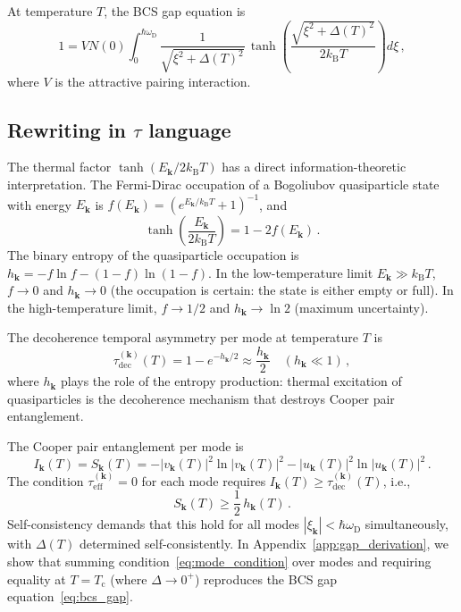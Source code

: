 \documentclass[prb,twocolumn,superscriptaddress,longbibliography,floatfix]{revtex4-2}
\newcommand{\kB}{k_{\mathrm{B}}}
\newcommand{\tauasym}{\tau}
\newcommand{\taueff}{\tauasym_{\mathrm{eff}}}
\newcommand{\taudec}{\tauasym_{\mathrm{dec}}}
\newcommand{\Tc}{T_{\mathrm{c}}}
\newcommand{\oD}{\omega_{\mathrm{D}}}
\newcommand{\Ek}{E_{\bm{k}}}
\newcommand{\xik}{\xi_{\bm{k}}}
\begin{document}
At temperature $T$, the BCS gap equation is~\cite{BCS1957}
\begin{equation}\label{eq:bcs_gap}
  1 = V N(0) \int_0^{\hbar\oD}
  \frac{1}{\sqrt{\xi^2 + \Delta(T)^2}}\,
  \tanh\!\left(\frac{\sqrt{\xi^2 + \Delta(T)^2}}{2\kB T}\right)
  d\xi\,,
\end{equation}
where $V$ is the attractive pairing interaction.

\subsection{Rewriting in $\tauasym$ language}

The thermal factor $\tanh(\Ek / 2\kB T)$ has a direct
information-theoretic interpretation.  The Fermi-Dirac occupation
of a Bogoliubov quasiparticle state with energy $\Ek$ is
$f(\Ek) = (e^{\Ek/\kB T} + 1)^{-1}$, and
\begin{equation}\label{eq:tanh_info}
  \tanh\!\left(\frac{\Ek}{2\kB T}\right)
  = 1 - 2f(\Ek)\,.
\end{equation}
The binary entropy of the quasiparticle occupation is
$h_{\bm{k}} = -f\ln f - (1-f)\ln(1-f)$.  In the low-temperature
limit $\Ek \gg \kB T$, $f \to 0$ and $h_{\bm{k}} \to 0$
(the occupation is certain: the state is either empty or full).
In the high-temperature limit, $f \to 1/2$ and
$h_{\bm{k}} \to \ln 2$ (maximum uncertainty).

The decoherence temporal asymmetry per mode at temperature $T$ is
\begin{equation}\label{eq:tau_dec_mode}
  \taudec^{(\bm{k})}(T) = 1 - e^{-h_{\bm{k}}/2}
  \approx \frac{h_{\bm{k}}}{2}
  \quad (h_{\bm{k}} \ll 1)\,,
\end{equation}
where $h_{\bm{k}}$ plays the role of the entropy production:
thermal excitation of quasiparticles is the decoherence mechanism
that destroys Cooper pair entanglement.

The Cooper pair entanglement per mode is
\begin{equation}\label{eq:I_mode}
  I_{\bm{k}}(T) = S_{\bm{k}}(T)
  = -|v_{\bm{k}}(T)|^2 \ln |v_{\bm{k}}(T)|^2
  - |u_{\bm{k}}(T)|^2 \ln |u_{\bm{k}}(T)|^2\,.
\end{equation}
The condition $\taueff^{(\bm{k})} = 0$ for each mode requires
$I_{\bm{k}}(T) \geq \taudec^{(\bm{k})}(T)$, i.e.,
\begin{equation}\label{eq:mode_condition}
  S_{\bm{k}}(T) \geq \frac{1}{2}\, h_{\bm{k}}(T)\,.
\end{equation}
Self-consistency demands that this hold for all modes
$|\xik| < \hbar\oD$ simultaneously, with $\Delta(T)$
determined self-consistently.  In Appendix~\ref{app:gap_derivation},
we show that summing condition~\eqref{eq:mode_condition} over modes
and requiring equality at $T = \Tc$ (where $\Delta \to 0^+$)
reproduces the BCS gap equation~\eqref{eq:bcs_gap}.
\end{document}
